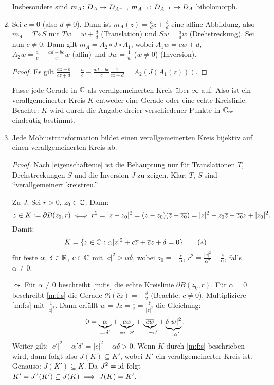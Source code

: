\documentclass[a4paper,twoside,DIV15,BCOR12mm]{scrbook}
\begin{document}
\begin{enumerate}
Insbesondere sind $m_A\colon D_A\rightarrow D_{A^{-1}}$, $m_{A^{-1}}\colon D_{A^{-1}}\rightarrow D_A$ biholomorph.
\item\label{eigenschaften:e} Sei $c=0$ (also $d\neq0$). Dann ist $m_A(z) = \frac{a}{d}z + \frac{b}{d}$ eine affine Abbildung, also $m_A = T \circ S$
  mit $Tw=w+\frac{d}{d}$ (Translation) und $Sw = \frac{a}{d}w$ (Drehstreckung). Sei nun $c\neq0$. Dann gilt $m_A = A_2 \circ J
  \circ A_1$, wobei $A_1w = cw+d$, $A_2w = \frac{a}{c} - \frac{ad-bc}{c}w$ (affin) und $Jw = \frac1w$ ($w\neq0$) (Inversion).
  \begin{proof}
    Es gilt $\displaystyle\frac{az+b}{cz+d} = \frac{a}{c} - \frac{ad-bc}{c}\frac{1}{cz+d} = A_2(J(A_1(z)))$.
  \end{proof}
Fasse jede Gerade in $\mathbb{C}$ als verallgemeinerten Kreis über $\infty$ auf. Also ist ein verallgemeinerter Kreis $K$ entweder eine Gerade oder eine echte Kreislinie. Beachte: $K$ wird durch die Angabe dreier verschiedener Punkte in $\mathbb{C}_\infty$ eindeutig bestimmt.
\item\label{eigenschaften:f} Jede Möbiustransformation bildet einen verallgemeinerten Kreis bijektiv auf einen verallgemeinerten Kreis ab.
\begin{proof} Nach \ref{eigenschaften:e}
 ist die Behauptung nur für Translationen $T$, Drehstreckungen $S$ und die Inversion $J$ zu zeigen. Klar: $T$, $S$ sind ``verallgemeinert kreistreu.''

Zu $J$: Sei $r>0$, $z_0\in\mathbb{C}$. Dann:
\[z\in K:= \partial B(z_0,r)\iff r^2 = |z-z_0|^2 = (z-z_0)(\overline{z}-\overline{z_0}) = |z|^2-z_0\overline{z}-\overline{z_0}z+|z_0|^2.\]
Damit: 
\[\label{m:f:s}K=\{z\in\mathbb{C}: \alpha|z|^2+c\overline{z}+\overline{c}z+\delta = 0\}\tag{$*$}\]
für feste $\alpha$, $\delta\in\mathbb{R}$, $c\in\mathbb{C}$ mit $|c|^2>\alpha\delta$, wobei $z_0=-\frac{c}{\alpha}$, $r^2=\frac{|c|^2}{\alpha^2}-\frac{\delta}{\alpha}$, falls $\alpha\neq 0$.

$\leadsto$ Für $\alpha\neq 0$ beschreibt \eqref{m:f:s} die echte Kreislinie $\partial B(z_0,r)$. Für $\alpha = 0$ beschreibt \eqref{m:f:s} die Gerade $\Re(\bar{c}z) = -\frac{\delta}{2}$ (Beachte: $c\neq 0$). Multipliziere \eqref{m:f:s} mit $\frac{1}{|z|^2}$. Dann erfüllt $w = Jz = \frac{1}{z} = \frac{\bar{z}}{|z|^2}$ die Gleichung:
\[ 0 = \underbrace{\alpha}_{=:\delta'} + \underbrace{cw}_{=: -\overline{c}'} + \underbrace{\overline{c}\overline{w}}_{=: -c'} + \underbrace{\delta|w|^2}_{=:\alpha'}.\]
Weiter gilt: $|c'|^2-\alpha'\delta' = |c|^2-\alpha\delta > 0$. Wenn $K$ durch \eqref{m:f:s} beschrieben wird, dann folgt also $J(K)\subseteq K'$, wobei $K'$ ein verallgemeinerter Kreis ist. Genauso: $J(K')\subseteq K$. Da $J^2 = \mathrm{id}$ folgt $K'=J^2(K')\subseteq J(K)\implies J(K)=K'$.
\end{proof}
\end{enumerate}
\end{document}
